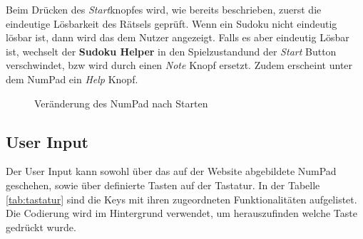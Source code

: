 Beim Drücken des \textit{Start}knopfes wird, wie bereits beschrieben, zuerst die eindeutige Lösbarkeit des Rätsels geprüft. Wenn ein Sudoku nicht eindeutig lösbar ist, dann wird das dem Nutzer angezeigt. Falls es aber eindeutig Lösbar ist, wechselt der \textbf{Sudoku Helper} in den \glqq Spielzustand\grqq und der \textit{Start} Button verschwindet, bzw wird durch einen \textit{Note} Knopf ersetzt. Zudem erscheint unter dem NumPad ein \textit{Help} Knopf. 



\begin{figure}[H]
	\centering
	\qquad
	\caption{Veränderung des NumPad nach Starten}%
\end{figure}

\subsection{User Input}

Der User Input kann sowohl über das auf der Website abgebildete NumPad geschehen, sowie über definierte Tasten auf der Tastatur. In der Tabelle \ref{tab:tastatur} sind die Keys mit ihren zugeordneten Funktionalitäten aufgelistet. Die Codierung wird im Hintergrund verwendet, um herauszufinden welche Taste gedrückt wurde.

